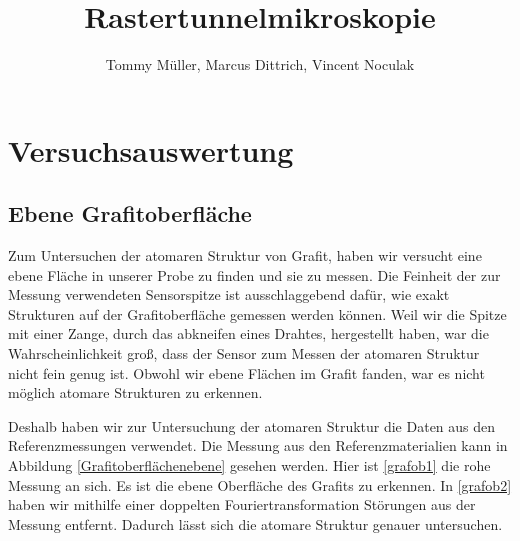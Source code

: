 \documentclass[10pt,a4paper]{article}
\author{Tommy Müller, Marcus Dittrich, Vincent Noculak}
\title{Rastertunnelmikroskopie}
\begin{document}
\maketitle
\newpage
\tableofcontents
\newpage

\section{Versuchsauswertung}

\subsection{Ebene Grafitoberfläche}

Zum Untersuchen der atomaren Struktur von Grafit, haben wir versucht eine ebene Fläche in unserer Probe zu finden und sie zu messen. Die Feinheit der zur Messung verwendeten Sensorspitze ist ausschlaggebend dafür, wie exakt Strukturen auf der Grafitoberfläche gemessen werden können. Weil wir die Spitze mit einer Zange, durch das abkneifen eines Drahtes, hergestellt haben, war die Wahrscheinlichkeit groß, dass der Sensor zum Messen der atomaren Struktur nicht fein genug ist. Obwohl wir ebene Flächen im Grafit fanden, war es nicht möglich atomare Strukturen zu erkennen.

 Deshalb haben wir zur Untersuchung der atomaren Struktur die Daten aus den Referenzmessungen verwendet. Die Messung aus den Referenzmaterialien kann in Abbildung \ref{Grafitoberflächenebene} gesehen werden. Hier ist \ref{grafob1} die rohe Messung an sich. Es ist die ebene Oberfläche des Grafits zu erkennen. In \ref{grafob2} haben wir mithilfe einer doppelten Fouriertransformation Störungen aus der Messung entfernt. Dadurch lässt sich die atomare Struktur genauer untersuchen.
\end{document}
